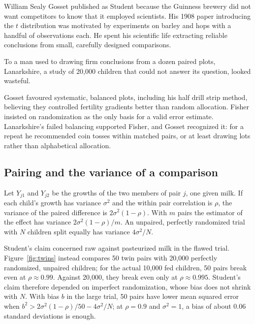 William Sealy Gosset published as Student because the Guinness brewery did not want competitors to know that it employed scientists. His 1908 paper introducing the $t$ distribution was motivated by experiments on barley and hops with a handful of observations each. He spent his scientific life extracting reliable conclusions from small, carefully designed comparisons.

To a man used to drawing firm conclusions from a dozen paired plots, Lanarkshire, a study of 20,000 children that could not answer its question, looked wasteful. 

Gosset favoured systematic, balanced plots, including his half drill strip method, believing they controlled fertility gradients better than random allocation. Fisher insisted on randomization as the only basis for a valid error estimate. Lanarkshire's failed balancing supported Fisher, and Gosset recognized it: for a repeat he recommended coin tosses within matched pairs, or at least drawing lots rather than alphabetical allocation.

\subsection{Pairing and the variance of a comparison}

Let $Y_{j1}$ and $Y_{j2}$ be the growths of the two members of pair $j$, one given milk. If each child's growth has variance $\sigma^2$ and the within pair correlation is $\rho$, the variance of the paired difference is $2\sigma^2(1 - \rho)$. With $m$ pairs the estimator of the effect has variance $2\sigma^2(1-\rho)/m$. An unpaired, perfectly randomized trial with $N$ children split equally has variance $4\sigma^2/N$.

Student's claim concerned raw against pasteurized milk in the flawed trial. Figure~\ref{fig:twins} instead compares 50 twin pairs with 20,000 perfectly randomized, unpaired children; for the actual 10,000 fed children, 50 pairs break even at $\rho\approx0.99$. Against 20,000, they break even only at $\rho \approx 0.995$. Student's claim therefore depended on imperfect randomization, whose bias does not shrink with $N$. With bias $b$ in the large trial, 50 pairs have lower mean squared error when $b^2 > 2\sigma^2(1 - \rho)/50 - 4\sigma^2/N$; at $\rho = 0.9$ and $\sigma^2 = 1$, a bias of about 0.06 standard deviations is enough.

